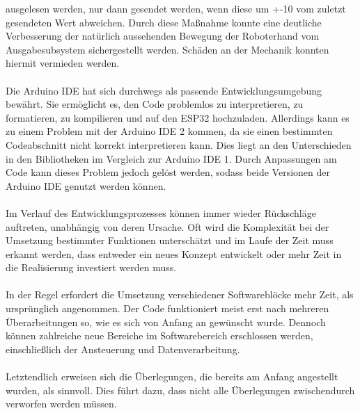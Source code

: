 \documentclass[titlepage,12pt,twoside]{article}
\begin{document}
ausgelesen werden, nur dann gesendet werden, wenn diese um +-10 vom zuletzt 
gesendeten Wert abweichen. Durch diese Maßnahme konnte eine deutliche 
Verbesserung der natürlich aussehenden Bewegung der Roboterhand vom 
Ausgabesubsystem sichergestellt werden. Schäden an der Mechanik konnten hiermit vermieden werden. \\
\\
Die Arduino IDE hat sich durchwegs als passende Entwicklungsumgebung bewährt. 
Sie ermöglicht es, den Code problemlos zu interpretieren, zu formatieren, zu 
kompilieren und auf den ESP32 hochzuladen. Allerdings kann es zu einem Problem 
mit der Arduino IDE 2 kommen, da sie einen bestimmten Codeabschnitt nicht 
korrekt interpretieren kann. Dies liegt an den Unterschieden in den Bibliotheken 
im Vergleich zur Arduino IDE 1. Durch Anpassungen am Code kann dieses Problem 
jedoch gelöst werden, sodass beide Versionen der Arduino IDE genutzt werden 
können. \\
\\
Im Verlauf des Entwicklungsprozesses können immer wieder Rückschläge auftreten, 
unabhängig von deren Ursache. Oft wird die Komplexität bei der Umsetzung 
bestimmter Funktionen unterschätzt und im Laufe der Zeit muss erkannt werden, 
dass entweder ein neues Konzept entwickelt oder mehr Zeit in die Realisierung 
investiert werden muss. \\
\\
In der Regel erfordert die Umsetzung verschiedener Softwareblöcke mehr Zeit, 
als ursprünglich angenommen. Der Code funktioniert meist erst nach mehreren 
Überarbeitungen so, wie es sich von Anfang an gewünscht wurde. Dennoch können 
zahlreiche neue Bereiche im Softwarebereich erschlossen werden, einschließlich 
der Ansteuerung und Datenverarbeitung. \\
\\
Letztendlich erweisen sich die Überlegungen, die bereits am Anfang angestellt 
wurden, als sinnvoll. Dies führt dazu, dass nicht alle Überlegungen 
zwischendurch verworfen werden müssen. \\
\\
\end{document}
